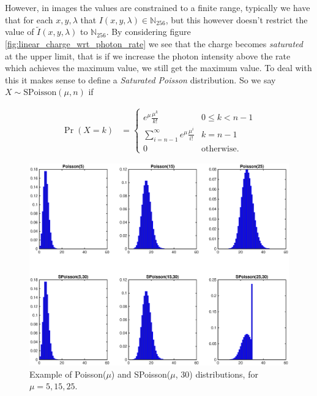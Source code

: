 \documentclass[12pt,twoside,notitlepage]{report}
\newcommand{\bb}[1]{\mathbb{#1}}
\begin{document}
            However, in images the values are constrained to a finite range, typically we have that for each $x, y, 
            \lambda$ that $I(x,y,\lambda) \in \bb{N}_{256}$, but this however doesn't restrict the value of
            $\tilde{I}(x,y,\lambda)$ to $\bb{N}_{256}$. By considering figure \ref{fig:linear_charge_wrt_photon_rate} 
            we see that the charge becomes \textit{saturated} at the upper limit, that is if we increase the photon 
            intensity above the rate which achieves the maximum value, we still get the maximum value. To deal with this 
            it makes sense to define a \textit{Saturated Poisson} distribution. So we say $X \sim \text{SPoisson}(\mu, n)$ 
            if 

            \begin{align}
                \Pr(X = k) & = 
                    \begin{cases}
                        e^{\mu} \frac{\mu^k}{k!} & 0 \leq k < n-1 \\
                        \sum\limits_{i=n-1}^\infty e^{\mu} \frac{\mu^i}{i!} & k = n-1 \\
                        0 & \text{otherwise}.
                    \end{cases} 
            \end{align}

            \begin{figure}[H]
                \centering 
                \includegraphics[scale=0.5]{poisson_distributions}
                \caption{Example of Poisson($\mu$) and SPoisson($\mu$, 30) distributions, for $\mu = 5,15,25$.}
            \end{figure}
\end{document}
